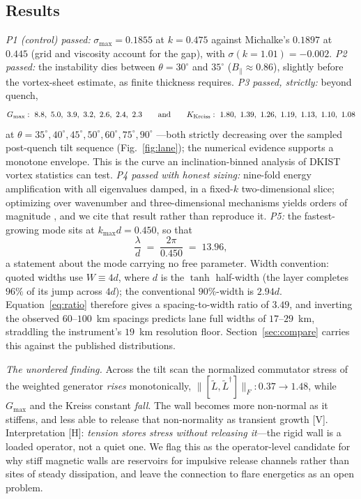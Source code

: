 \documentclass[11pt]{article}
\theoremstyle{definition}
\theoremstyle{remark}
\begin{document}
\subsection{Results}
\emph{P1 (control) passed:} $\sigma_{\max}=0.1855$ at $k=0.475$ against
Michalke's $0.1897$ at $0.445$ (grid and viscosity account for the gap), with
$\sigma(k=1.01)=-0.002$. \emph{P2 passed:} the instability dies between
$\theta=30^\circ$ and $35^\circ$ ($B_\parallel\approx0.86$), slightly before
the vortex-sheet estimate, as finite thickness requires. \emph{P3 passed,
strictly:} beyond quench,
\[
G_{\max}: \ 8.8,\ 5.0,\ 3.9,\ 3.2,\ 2.6,\ 2.4,\ 2.3
\qquad\text{and}\qquad
K_{\rm Kreiss}: \ 1.80,\ 1.39,\ 1.26,\ 1.19,\ 1.13,\ 1.10,\ 1.08
\]
at $\theta=35^\circ,40^\circ,45^\circ,50^\circ,60^\circ,75^\circ,90^\circ$
---both strictly decreasing over the sampled post-quench tilt sequence
(Fig.~\ref{fig:lane}); the numerical evidence supports a monotone envelope. This is the curve an
inclination-binned analysis of DKIST vortex statistics can test.
\emph{P4 passed with honest sizing:} nine-fold energy amplification with all
eigenvalues damped, in a fixed-$k$ two-dimensional slice; optimizing over
wavenumber and three-dimensional mechanisms yields orders of magnitude
\cite{fraser}, and we cite that result rather than reproduce it.
\emph{P5:} the fastest-growing mode sits at $k_{\max}d=0.450$, so that
\begin{equation}\label{eq:ratio}
\frac{\lambda}{d} \;=\; \frac{2\pi}{0.450} \;=\; 13.96 ,
\end{equation}
a statement about the mode carrying no free parameter. Width convention:
quoted widths use $W\equiv4d$, where $d$ is the $\tanh$ half-width (the layer
completes $96\%$ of its jump across $4d$); the conventional $90\%$-width is
$2.94d$. Equation~\eqref{eq:ratio} therefore gives a spacing-to-width ratio
of $3.49$, and inverting the observed $60$--$100$~km spacings predicts lane
full widths of $17$--$29$~km, straddling the instrument's $19$~km resolution
floor. Section~\ref{sec:compare} carries this against the published
distributions.

\emph{The unordered finding.} Across the tilt scan the normalized commutator
stress of the weighted generator \emph{rises} monotonically,
$\|[\tilde L,\tilde L^\dagger]\|_F: 0.37\to1.48$, while $G_{\max}$ and the
Kreiss constant \emph{fall}. The wall becomes more non-normal as it stiffens,
and less able to release that non-normality as transient growth [V].
Interpretation [H]: \emph{tension stores stress without releasing it}---the
rigid wall is a loaded operator, not a quiet one. We flag this as the
operator-level candidate for why stiff magnetic walls are reservoirs for
impulsive release channels rather than sites of steady dissipation, and leave
the connection to flare energetics as an open problem.
\end{document}
